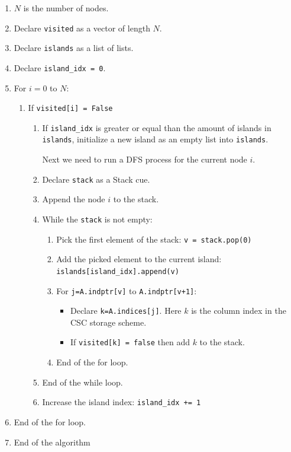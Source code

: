 \documentclass[nols,a4paper,twoside,notoc,fleqn]{tufte-book}
\begin{document}
\begin{enumerate}
	\item $N$ is the number of nodes.
	\item Declare \verb|visited| as a vector of length $N$.
	\item Declare \verb|islands| as a list of lists.
	\item Declare \verb|island_idx = 0|.
	\item For $i=0$ to $N$:
	
	\begin{enumerate}
		\item If \verb|visited[i] = False|
		
		\begin{enumerate}
			\item If \verb|island_idx| is greater or equal than the amount of islands in \verb|islands|, initialize a new island as an empty list into \verb|islands|.
			
			Next we need to run a DFS process for the current node $i$.
			
			\item Declare \verb|stack| as a Stack cue.
			\item Append the node $i$ to the stack.
			
			\item While the \verb|stack| is not empty:
			
			\begin{enumerate}
				\item Pick the first element of the stack: \verb|v = stack.pop(0)|
				
				\item Add the picked element to the current island: \verb|islands[island_idx].append(v)|
								
				\item For \verb|j=A.indptr[v]| to \verb|A.indptr[v+1]|:
				
				\begin{itemize}
					\item Declare \verb|k=A.indices[j]|. Here $k$ is the column index in the CSC storage scheme.
					
					\item If \verb|visited[k] = false| then add $k$ to the stack.
				\end{itemize}
			
				\item End of the for loop.
				
			\end{enumerate}
			
			\item End of the while loop.
			
			\item Increase the island index: \verb|island_idx += 1|
		
		\end{enumerate}
		
	\end{enumerate}

\item End of the for loop.

\item End of the algorithm
\end{enumerate}
\end{document}
